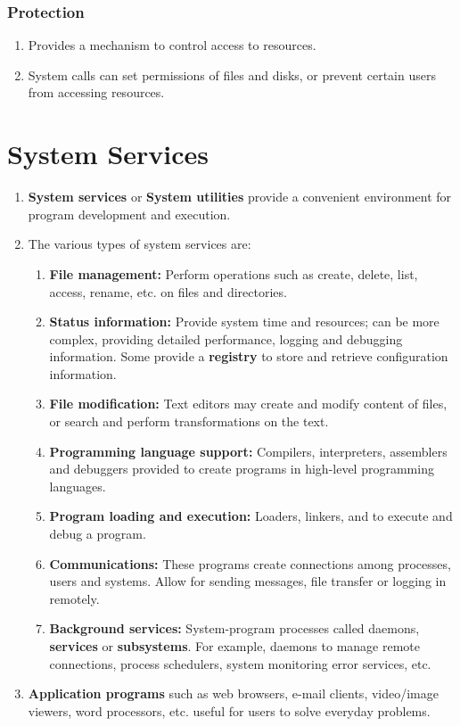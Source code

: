 \documentclass[journal,12pt,twocolumn]{IEEEtran}
\begin{document}
\subsubsection{Protection}
\begin{enumerate}
    \item Provides a mechanism to control access to resources.
    \item System calls can set permissions of files and disks, or
    prevent certain users from accessing resources.
\end{enumerate}

\section{System Services}
\begin{enumerate}
    \item \textbf{System services} or \textbf{System utilities} provide a 
    convenient environment for program development and execution.
    \item The various types of system services are:
    \begin{enumerate}
        \item \textbf{File management:} Perform operations such as create, 
        delete, list, access, rename, etc. on files and directories.
        \item \textbf{Status information:} Provide system time and resources;
        can be more complex, providing detailed performance, logging and 
        debugging information. Some provide a \textbf{registry} to store and 
        retrieve configuration information.
        \item \textbf{File modification:} Text editors may create and modify 
        content of files, or search and perform transformations on the text.
        \item \textbf{Programming language support:} Compilers, interpreters,
        assemblers and debuggers provided to create programs in high-level
        programming languages.
        \item \textbf{Program loading and execution:} Loaders, linkers, and 
        to execute and debug a program.
        \item \textbf{Communications:} These programs create connections among processes, 
        users and systems. Allow for sending messages, file transfer or logging 
        in remotely.
        \item \textbf{Background services:} System-program processes called 
        daemons, \textbf{services} or \textbf{subsystems}. For example, daemons 
        to manage remote connections, process schedulers, system monitoring error 
        services, etc.
    \end{enumerate}
    \item \textbf{Application programs} such as web browsers, e-mail clients, 
    video/image viewers, word processors, etc. useful for users to solve 
    everyday problems. 
\end{enumerate}
\end{document}
